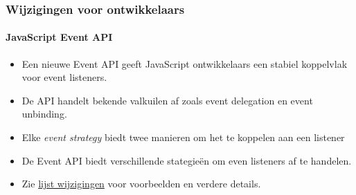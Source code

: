 
\begin{frame}[fragile]
	\frametitle{Wijzigingen voor ontwikkelaars}
	\framesubtitle{JavaScript Event API}

	\begin{itemize}
		\item Een nieuwe Event API geeft JavaScript ontwikkelaars een stabiel koppelvlak voor event listeners.
		\item De API handelt bekende valkuilen af zoals event delegation en event unbinding.
		\item Elke \textit{event strategy} biedt twee manieren om het te koppelen aan een listener
		\item De Event API biedt verschillende stategieën om even listeners af te handelen.
		\item Zie
			\href{https://docs.typo3.org/c/typo3/cms-core/master/en-us/Changelog/10.3/Feature-90471-JavaScriptEventAPI.html}{lijst wijzigingen}
			voor voorbeelden en verdere details.
	\end{itemize}

\end{frame}

